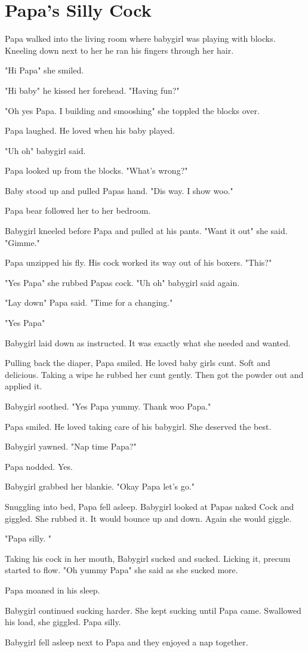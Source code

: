 \section{Papa's Silly Cock}

Papa walked into the living room where babygirl was playing with blocks. Kneeling down next to her he ran his fingers through her hair. 

"Hi Papa" she smiled. 

"Hi baby" he kissed her forehead. "Having fun?"

"Oh yes Papa. I building and smooshing" she toppled the blocks over. 

Papa laughed. He loved when his baby played. 

"Uh oh" babygirl said. 

Papa looked up from the blocks. "What's wrong?"

Baby stood up and pulled Papas hand. "Dis way. I show woo."

Papa bear followed her to her bedroom. 

Babygirl kneeled before Papa and pulled at his pants. "Want it out" she said. "Gimme."

Papa unzipped his fly. His cock worked its way out of his boxers. "This?"

"Yes Papa" she rubbed Papas cock. "Uh oh" babygirl said again. 

"Lay down" Papa said. "Time for a changing."

"Yes Papa"

Babygirl laid down as instructed. It was exactly what she needed and wanted. 

Pulling back the diaper, Papa smiled. He loved baby girls cunt. Soft and delicious. Taking a wipe he rubbed her cunt gently. Then got the powder out and applied it. 

Babygirl soothed. "Yes Papa yummy. Thank woo Papa."

Papa smiled. He loved taking care of his babygirl. She deserved the best. 

Babygirl yawned. "Nap time Papa?"

Papa nodded. Yes. 

Babygirl grabbed her blankie. "Okay Papa let's go."

Snuggling into bed, Papa fell asleep. Babygirl looked at Papas naked Cock and giggled. She rubbed it. It would bounce up and down. Again she would giggle. 

"Papa silly. "

Taking his cock in her mouth, Babygirl sucked and sucked. Licking it, precum started to flow. "Oh yummy Papa" she said as she sucked more. 

Papa moaned in his sleep. 

Babygirl continued sucking harder. She kept sucking until Papa came. Swallowed his load, she giggled. Papa silly. 

Babygirl fell asleep next to Papa and they enjoyed a nap together. 

